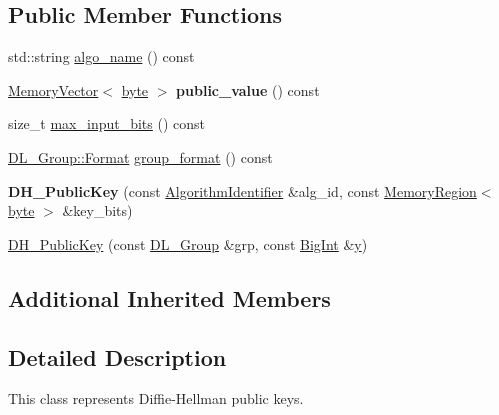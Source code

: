 \subsection*{Public Member Functions}
\begin{DoxyCompactItemize}
\item 
std\-::string \hyperlink{classBotan_1_1DH__PublicKey_a71d508fd04ea505e0689d895aac767b6}{algo\-\_\-name} () const 
\item 
\hypertarget{classBotan_1_1DH__PublicKey_a964bb434ef56a54a9527066fb7dc757b}{\hyperlink{classBotan_1_1MemoryVector}{Memory\-Vector}$<$ \hyperlink{namespaceBotan_a7d793989d801281df48c6b19616b8b84}{byte} $>$ {\bfseries public\-\_\-value} () const }\label{classBotan_1_1DH__PublicKey_a964bb434ef56a54a9527066fb7dc757b}

\item 
size\-\_\-t \hyperlink{classBotan_1_1DH__PublicKey_a749769dbeb070362b23f1fe670a84f49}{max\-\_\-input\-\_\-bits} () const 
\item 
\hyperlink{classBotan_1_1DL__Group_ac602a30420ceec03fa181a10b09312a7}{D\-L\-\_\-\-Group\-::\-Format} \hyperlink{classBotan_1_1DH__PublicKey_ae28af47f3e7ab62937ddfeba4846ee0b}{group\-\_\-format} () const 
\item 
\hypertarget{classBotan_1_1DH__PublicKey_a2999e44b93542de594ce561783dba275}{{\bfseries D\-H\-\_\-\-Public\-Key} (const \hyperlink{classBotan_1_1AlgorithmIdentifier}{Algorithm\-Identifier} \&alg\-\_\-id, const \hyperlink{classBotan_1_1MemoryRegion}{Memory\-Region}$<$ \hyperlink{namespaceBotan_a7d793989d801281df48c6b19616b8b84}{byte} $>$ \&key\-\_\-bits)}\label{classBotan_1_1DH__PublicKey_a2999e44b93542de594ce561783dba275}

\item 
\hyperlink{classBotan_1_1DH__PublicKey_ac8575a25b158bcb063033c193acae93b}{D\-H\-\_\-\-Public\-Key} (const \hyperlink{classBotan_1_1DL__Group}{D\-L\-\_\-\-Group} \&grp, const \hyperlink{classBotan_1_1BigInt}{Big\-Int} \&\hyperlink{classBotan_1_1DL__Scheme__PublicKey_ab4e7d9e233e3c89de236699ea5774802}{y})
\end{DoxyCompactItemize}
\subsection*{Additional Inherited Members}


\subsection{Detailed Description}
This class represents Diffie-\/\-Hellman public keys. 

